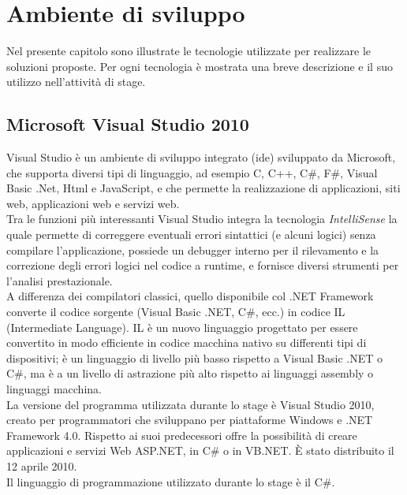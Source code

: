 
\chapter{Ambiente di sviluppo}
\label{cap:ambiente-sviluppo}

Nel presente capitolo sono illustrate le tecnologie utilizzate per realizzare le soluzioni proposte. Per ogni tecnologia è mostrata una breve descrizione e il suo utilizzo nell'attività di stage.
\section{Microsoft Visual Studio 2010}
Visual Studio è un ambiente di sviluppo integrato (\gls{ide}) sviluppato da Microsoft, che supporta diversi tipi di linguaggio, ad esempio C, C++, C\#, F\#, Visual Basic .Net, Html e JavaScript, e che permette la realizzazione di applicazioni, siti web, applicazioni web e servizi web.
\\
Tra le funzioni più interessanti Visual Studio integra la tecnologia \textit{IntelliSense} la quale permette di correggere eventuali errori sintattici (e alcuni logici) senza compilare l'applicazione, possiede un debugger interno per il rilevamento e la correzione degli errori logici nel codice a runtime, e fornisce diversi strumenti per l'analisi prestazionale.
\\
A differenza dei compilatori classici, quello disponibile col .NET Framework converte il codice sorgente (Visual Basic .NET, C\#, ecc.) in codice IL (Intermediate Language).
IL è un nuovo linguaggio progettato per essere convertito in modo efficiente in codice macchina nativo su differenti tipi di dispositivi; è un linguaggio di livello più basso rispetto a Visual Basic .NET o C\#, ma è a un livello di astrazione più alto rispetto ai linguaggi assembly o linguaggi macchina.
\\
La versione del programma utilizzata durante lo stage è Visual Studio 2010, creato per programmatori che sviluppano per piattaforme Windows e .NET Framework 4.0. Rispetto ai suoi predecessori offre la possibilità di creare applicazioni e servizi Web ASP.NET, in C\# o in VB.NET. È stato distribuito il 12 aprile 2010. 
\\
Il linguaggio di programmazione utilizzato durante lo stage è il C\#.

